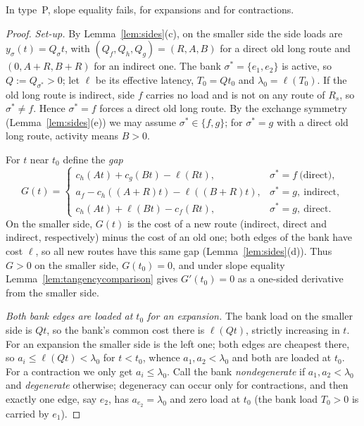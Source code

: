 \begin{lemma}\label{lem:typeP}
In type~P, slope equality fails, for expansions and for contractions.
\end{lemma}

\begin{proof}
\emph{Set-up.} By Lemma~\ref{lem:sides}(c), on the smaller side the side
loads are $y_\sigma(t)=Q_\sigma t$, with $(Q_f,Q_h,Q_g)=(R,A,B)$ for a direct
old long route and $(0,A+R,B+R)$ for an indirect one. The bank
$\sigma^*=\{e_1,e_2\}$ is active, so $Q:=Q_{\sigma^*}>0$; let $\ell$ be its
effective latency, $T_0=Qt_0$ and $\lambda_0=\ell(T_0)$. If the old long
route is indirect, side $f$ carries no load and is not on any route of
$R_s$, so $\sigma^*\ne f$. Hence $\sigma^*=f$ forces a direct old long
route. By the exchange symmetry (Lemma~\ref{lem:sides}(e)) we may assume
$\sigma^*\in\{f,g\}$; for $\sigma^*=g$ with a direct old long route, activity
means $B>0$.

For $t$ near $t_0$ define the \emph{gap}
\[
 G(t)=
 \begin{cases}
 c_h(At)+c_g(Bt)-\ell(Rt), & \sigma^*=f\ \text{(direct)},\\
 a_f-c_h((A+R)t)-\ell((B+R)t), & \sigma^*=g,\ \text{indirect},\\
 c_h(At)+\ell(Bt)-c_f(Rt), & \sigma^*=g,\ \text{direct}.
 \end{cases}
\]
On the smaller side, $G(t)$ is the cost of a new route (indirect, direct and
indirect, respectively) minus the cost of an old one; both edges of the bank
have cost $\ell$, so all new routes have this same gap
(Lemma~\ref{lem:sides}(d)). Thus $G>0$ on the smaller side, $G(t_0)=0$, and
under slope equality Lemma~\ref{lem:tangencycomparison} gives $G'(t_0)=0$ as a
one-sided derivative from the smaller side.

\emph{Both bank edges are loaded at $t_0$ for an expansion.} The bank load
on the smaller side is $Qt$, so the bank's common cost there is $\ell(Qt)$,
strictly increasing in $t$. For an expansion the smaller side is the left
one; both edges are cheapest there, so $a_i\le\ell(Qt)<\lambda_0$ for
$t<t_0$, whence $a_1,a_2<\lambda_0$ and both are loaded at $t_0$. For a
contraction we only get $a_i\le\lambda_0$. Call the bank
\emph{nondegenerate} if $a_1,a_2<\lambda_0$ and \emph{degenerate} otherwise;
degeneracy can occur only for contractions, and then exactly one edge, say
$e_2$, has $a_{e_2}=\lambda_0$ and zero load at $t_0$ (the bank load
$T_0>0$ is carried by $e_1$).


\end{proof}
